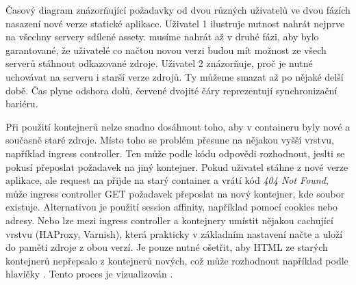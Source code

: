         \begin{iffigure}
            \centering
            \caption{Časový diagram znázorňující požadavky od dvou různých uživatelů ve dvou fázích nasazení nové verze statické aplikace. Uživatel 1 ilustruje nutnost nahrát nejprve na všechny servery sdílené assety. \HTML musíme nahrát až v druhé fázi, aby bylo garantované, že uživatelé co načtou novou verzi \HTML budou mít možnost ze všech serverů stáhnout odkazované zdroje. Uživatel 2 znázorňuje, proč je nutné uchovávat na serveru i starší verze zdrojů. Ty můžeme smazat až po nějaké delší době. Čas plyne odshora dolů, červené dvojité čáry reprezentují synchronizační bariéru.}
            \label{fig:static-deploy}
        \end{iffigure}

        Při použití kontejnerů nelze snadno dosáhnout toho, aby v containeru byly nové a současně staré zdroje. Místo toho se problém přesune na nějakou vyšší vrstvu, například ingress controller. Ten může podle \HTTP kódu odpovědi rozhodnout, jeslti se pokusí přeposlat požadavek na jiný kontejner. Pokud uživatel stáhne \HTML z nové verze aplikace, ale request na  přijde na starý container a vrátí kód \textit{404 Not Found}, může ingress controller GET požadavek přeposlat na nový kontejner, kde soubor existuje. Alternativou je použití session affinity, například pomocí cookies nebo  adresy. Nebo lze mezi ingress controller a kontejnery umístit nějakou cachující \HTTP vrstvu (HAProxy, Varnish), která prakticky v základním nastavení načte a uloží do paměti zdroje z obou verzí. Je pouze nutné ošetřit, aby HTML ze starých kontejnerů nepřepsalo \HTML z kontejnerů nových, což může rozhodnout například podle hlavičky . Tento proces je vizualizován .

